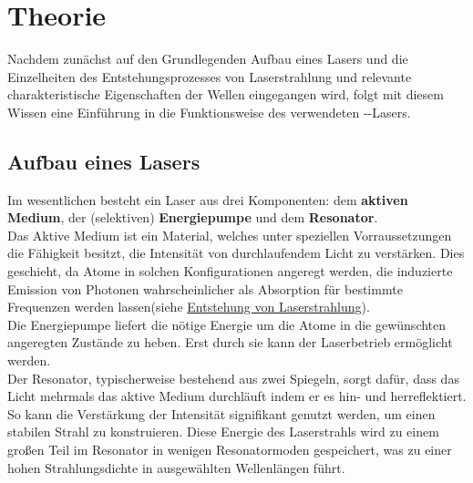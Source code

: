 \section{Theorie}\label{sec:theorie}
Nachdem zunächst auf den Grundlegenden Aufbau eines Lasers und die Einzelheiten des Entstehungsprozesses von Laserstrahlung und relevante charakteristische Eigenschaften der Wellen eingegangen wird, folgt mit diesem Wissen eine Einführung in die Funktionsweise des verwendeten --Lasers.
\subsection{Aufbau eines Lasers}
Im wesentlichen besteht ein Laser aus drei Komponenten: dem \textbf{aktiven Medium}, der (selektiven) \textbf{Energiepumpe} und dem \textbf{Resonator}.\\
Das Aktive Medium ist ein Material, welches unter speziellen Vorraussetzungen die Fähigkeit besitzt, die Intensität von durchlaufendem Licht zu verstärken. Dies geschieht, da Atome in solchen Konfigurationen angeregt werden, die induzierte Emission von Photonen wahrscheinlicher als Absorption für bestimmte Frequenzen werden lassen(siehe \hyperref[subsec:entstehung]{Entstehung von Laserstrahlung}).\\
Die Energiepumpe liefert die nötige Energie um die Atome in die gewünschten angeregten Zustände zu heben. Erst durch sie kann der Laserbetrieb ermöglicht werden.\\
Der Resonator, typischerweise bestehend aus zwei Spiegeln, sorgt dafür, dass das Licht mehrmals das aktive Medium durchläuft indem er es hin- und herreflektiert. So kann die Verstärkung der Intensität signifikant genutzt werden, um einen stabilen Strahl zu konstruieren. Diese Energie des Laserstrahls wird zu einem großen Teil im Resonator in wenigen Resonatormoden gespeichert, was zu einer hohen Strahlungsdichte in ausgewählten Wellenlängen führt.\cite{Demtroeder} 
